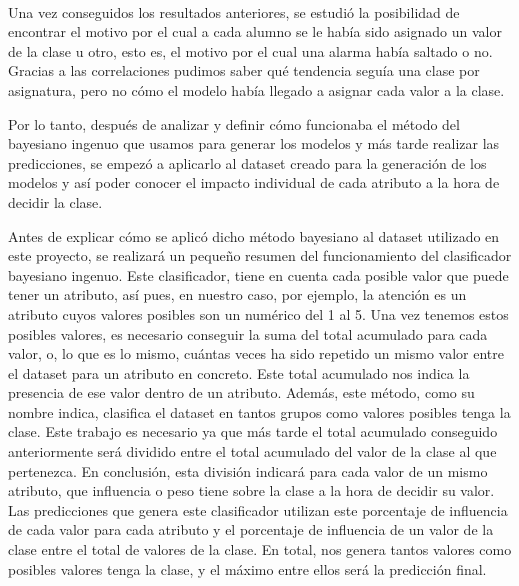 \paragraph{}
Una vez conseguidos los resultados anteriores, se estudió la posibilidad de encontrar el motivo por el cual a cada alumno se le había sido asignado un valor de la clase u otro, esto es, el motivo por el cual una alarma había saltado o no. Gracias a las correlaciones pudimos saber qué tendencia seguía una clase por asignatura, pero no cómo el modelo había llegado a asignar cada valor a la clase.

Por lo tanto, después de analizar y definir cómo funcionaba el método del bayesiano ingenuo que usamos para generar los modelos y más tarde realizar las predicciones, se empezó a aplicarlo al dataset creado para la generación de los modelos y así poder conocer el impacto individual de cada atributo a la hora de decidir la clase.

Antes de explicar cómo se aplicó dicho método bayesiano al dataset utilizado en este proyecto, se realizará un pequeño resumen del funcionamiento del clasificador bayesiano ingenuo. Este clasificador, tiene en cuenta cada posible valor que puede tener un atributo, así pues, en nuestro caso, por ejemplo, la atención es un atributo cuyos valores posibles son un numérico del 1 al 5. Una vez tenemos estos posibles valores, es necesario conseguir la suma del total acumulado para cada valor, o, lo que es lo mismo, cuántas veces ha sido repetido un mismo valor entre el dataset para un atributo en concreto. Este total acumulado nos indica la presencia de ese valor dentro de un atributo. Además, este método, como su nombre indica, clasifica el dataset en tantos grupos como valores posibles tenga la clase. Este trabajo es necesario ya que más tarde el total acumulado conseguido anteriormente será dividido entre el total acumulado del valor de la clase al que pertenezca. En conclusión, esta división indicará para cada valor de un mismo atributo, que influencia o peso tiene sobre la clase a la hora de decidir su valor. Las predicciones que genera este clasificador utilizan este porcentaje de influencia de cada valor para cada atributo y el porcentaje de influencia de un valor de la clase entre el total de valores de la clase. En total, nos genera tantos valores como posibles valores tenga la clase, y el máximo entre ellos será la predicción final.


